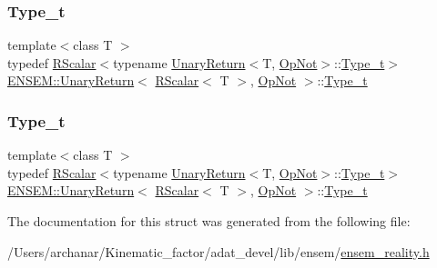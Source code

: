 \subsubsection{\texorpdfstring{Type\_t}{Type\_t}\hspace{0.1cm}{\footnotesize\ttfamily [1/2]}}
{\footnotesize\ttfamily template$<$class T $>$ \\
typedef \mbox{\hyperlink{classENSEM_1_1RScalar}{R\+Scalar}}$<$typename \mbox{\hyperlink{structENSEM_1_1UnaryReturn}{Unary\+Return}}$<$T, \mbox{\hyperlink{structENSEM_1_1OpNot}{Op\+Not}}$>$\+::\mbox{\hyperlink{structENSEM_1_1UnaryReturn_3_01RScalar_3_01T_01_4_00_01OpNot_01_4_af9f59bfbcb4e45c668599e7707d39a0c}{Type\+\_\+t}}$>$ \mbox{\hyperlink{structENSEM_1_1UnaryReturn}{E\+N\+S\+E\+M\+::\+Unary\+Return}}$<$ \mbox{\hyperlink{classENSEM_1_1RScalar}{R\+Scalar}}$<$ T $>$, \mbox{\hyperlink{structENSEM_1_1OpNot}{Op\+Not}} $>$\+::\mbox{\hyperlink{structENSEM_1_1UnaryReturn_3_01RScalar_3_01T_01_4_00_01OpNot_01_4_af9f59bfbcb4e45c668599e7707d39a0c}{Type\+\_\+t}}}

\mbox{\label{structENSEM_1_1UnaryReturn_3_01RScalar_3_01T_01_4_00_01OpNot_01_4_af9f59bfbcb4e45c668599e7707d39a0c}} 
\subsubsection{\texorpdfstring{Type\_t}{Type\_t}\hspace{0.1cm}{\footnotesize\ttfamily [2/2]}}
{\footnotesize\ttfamily template$<$class T $>$ \\
typedef \mbox{\hyperlink{classENSEM_1_1RScalar}{R\+Scalar}}$<$typename \mbox{\hyperlink{structENSEM_1_1UnaryReturn}{Unary\+Return}}$<$T, \mbox{\hyperlink{structENSEM_1_1OpNot}{Op\+Not}}$>$\+::\mbox{\hyperlink{structENSEM_1_1UnaryReturn_3_01RScalar_3_01T_01_4_00_01OpNot_01_4_af9f59bfbcb4e45c668599e7707d39a0c}{Type\+\_\+t}}$>$ \mbox{\hyperlink{structENSEM_1_1UnaryReturn}{E\+N\+S\+E\+M\+::\+Unary\+Return}}$<$ \mbox{\hyperlink{classENSEM_1_1RScalar}{R\+Scalar}}$<$ T $>$, \mbox{\hyperlink{structENSEM_1_1OpNot}{Op\+Not}} $>$\+::\mbox{\hyperlink{structENSEM_1_1UnaryReturn_3_01RScalar_3_01T_01_4_00_01OpNot_01_4_af9f59bfbcb4e45c668599e7707d39a0c}{Type\+\_\+t}}}



The documentation for this struct was generated from the following file\+:\begin{DoxyCompactItemize}
\item 
/\+Users/archanar/\+Kinematic\+\_\+factor/adat\+\_\+devel/lib/ensem/\mbox{\hyperlink{lib_2ensem_2ensem__reality_8h}{ensem\+\_\+reality.\+h}}\end{DoxyCompactItemize}
